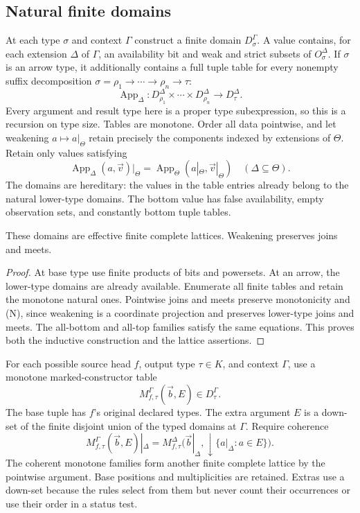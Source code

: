 \subsection{Natural finite domains}
At each type $\sigma$ and context $\Gamma$ construct a finite domain
$D_\sigma^\Gamma$. A value contains, for each extension $\Delta$ of
$\Gamma$, an availability bit and weak and strict subsets of
$O_\sigma^\Delta$. If $\sigma$ is an arrow type, it additionally contains
a full tuple table for every nonempty suffix decomposition
$\sigma=\rho_1\to\cdots\to\rho_n\to\tau$:
\[
 \operatorname{App}_\Delta:
 D_{\rho_1}^\Delta\times\cdots\times D_{\rho_n}^\Delta
 \longrightarrow D_\tau^\Delta .
\]
Every argument and result type here is a proper type subexpression, so
this is a recursion on type size. Tables are monotone. Order all data
pointwise, and let weakening $a\mapsto a|_\Theta$ retain precisely the
components indexed by extensions of $\Theta$. Retain only values satisfying
\[
 \operatorname{App}_\Delta(a,\vec v)|_\Theta
 =\operatorname{App}_\Theta(a|_\Theta,\vec v|_\Theta)
 \quad(\Delta\subseteq\Theta).
 \tag{N}
\]
The domains are hereditary: the values in the table entries already belong
to the natural lower-type domains. The bottom value has false availability,
empty observation sets, and constantly bottom tuple tables.

\begin{lemma}\label{lem:finite-lattices}
These domains are effective finite complete lattices. Weakening preserves
joins and meets.
\end{lemma}
\begin{proof}
At base type use finite products of bits and powersets. At an arrow, the
lower-type domains are already available. Enumerate all finite tables and
retain the monotone natural ones. Pointwise joins and meets preserve
monotonicity and (N), since weakening is a coordinate projection and
preserves lower-type joins and meets. The all-bottom and all-top families
satisfy the same equations. This proves both the inductive construction
and the lattice assertions.
\end{proof}

For each possible source head $f$, output type $\tau\in K$, and context
$\Gamma$, use a monotone marked-constructor table
\[
 M_{f,\tau}^\Gamma(\vec b,E)\in D_\tau^\Gamma.
\]
The base tuple has $f$'s original declared types. The extra argument $E$
is a down-set of the finite disjoint union of the typed domains at
$\Gamma$. Require coherence
\[
 M_{f,\tau}^\Gamma(\vec b,E)|_\Delta
 =M_{f,\tau}^\Delta
   \bigl(\vec b|_\Delta,\downarrow\{a|_\Delta:a\in E\}\bigr).
 \tag{C}
\]
The coherent monotone families form another finite complete lattice by
the pointwise argument. Base positions and multiplicities are retained.
Extras use a down-set because the rules select from them but never count
their occurrences or use their order in a status test.

